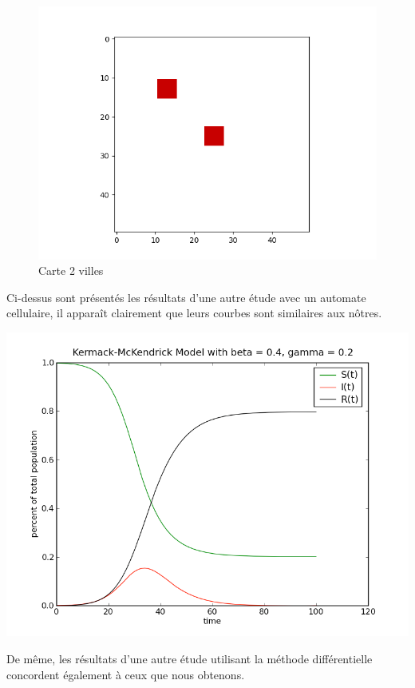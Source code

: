 \documentclass{article}
\begin{document}
\begin{figure}[H]
\caption{Carte 2 villes}
\centering
\includegraphics[scale=0.8]{../images/carte_deux_villes.png}
\end{figure}




Ci-dessus sont présentés les résultats d'une autre étude avec un automate cellulaire, il apparaît clairement que leurs courbes sont similaires aux nôtres.

\includegraphics[scale=0.5]{../images/differentiel_1.png} 

De même, les résultats d'une autre étude utilisant la méthode différentielle concordent également à\pageref{9} ceux que nous obtenons.
\end{document}
